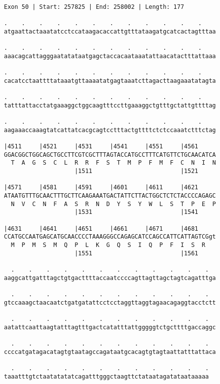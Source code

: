 \documentclass{article}
\begin{document}
\newpage
\begin{Verbatim}[fontfamily=courier]
Exon 50 | Start: 257825 | End: 258002 | Length: 177

.    .    .    .    .    .    .    .    .    .    .    .    
atgaattactaaatatcctccataagacaccattgtttataagatgcatcactagtttaa

.    .    .    .    .    .    .    .    .    .    .    .    
aaacagcattagggaatatataatgagctaccacaataaatattaacatactttattaaa

.    .    .    .    .    .    .    .    .    .    .    .    
cacatcctaattttataaatgttaaaatatgagtaaatcttagacttaagaaatatagta

.    .    .    .    .    .    .    .    .    .    .    .    
tatttattacctatgaaaggctggcaagtttccttgaaaggctgtttgctattgttttag

.    .    .    .    .    .    .    .    .    .    .    .    
aagaaaccaaagtatcattatcacgcagtcctttactgttttctctccaaatctttctag

|4511     |4521     |4531     |4541     |4551     |4561     
GGACGGCTGGCAGCTGCCTTCGTCGCTTTAGTACCATGCCTTTCATGTTCTGCAACATCA
  T  A  G  S  C  L  R  R  F  S  T  M  P  F  M  F  C  N  I  N
                    |1511                         |1521     

|4571     |4581     |4591     |4601     |4611     |4621     
ATAATGTTTGCAACTTTGCTTCAAGAAATGACTATTCTTACTGGCTCTCTACCCCAGAGC
  N  V  C  N  F  A  S  R  N  D  Y  S  Y  W  L  S  T  P  E  P
                    |1531                         |1541     

|4631     |4641     |4651     |4661     |4671     |4681     
CCATGCCAATGAGCATGCAACCCCTAAAGGGCCAGAGCATCCAGCCATTCATTAGTCGgt
  M  P  M  S  M  Q  P  L  K  G  Q  S  I  Q  P  F  I  S  R   
                    |1551                         |1561     

  .    .    .    .    .    .    .    .    .    .    .    .  
aaggcattgatttagctgtgacttttaccaatccccagttagttagctagtcagatttga

  .    .    .    .    .    .    .    .    .    .    .    .  
gtccaaagctaacaatctgatgatattcctcctaggttaggtagaacagaggtacctctt

  .    .    .    .    .    .    .    .    .    .    .    .  
aatattcaattaagtatttagtttgactcatatttattgggggtctgcttttgaccaggc

  .    .    .    .    .    .    .    .    .    .    .    .  
ccccatgatagacatagtgtaatagccagataatgcacagtgtagtaattatttattaca

  .    .    .    .    .    .    .    .    .    .    .    .
taaatttgtctaatatatatcagatttgggctaagttctataatagatataataaaaa
\end{Verbatim}
\end{document}
